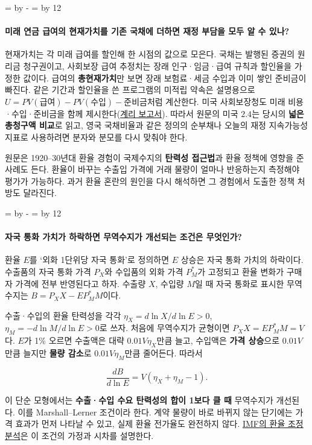 \documentclass[10pt,a4paper]{article}
\newcommand{\ReserveQuestionSpace}{%
  \par\begingroup
  \dimen0=\pagegoal \advance\dimen0 by -\pagetotal
  \dimen2=\baselineskip \multiply\dimen2 by 12
  \ifdim\dimen0<\dimen2 \newpage\fi
  \endgroup}
\begin{document}
\ReserveQuestionSpace
\paragraph{미래 연금 급여의 현재가치를 기존 국채에 더하면 재정 부담을 모두 알 수 있나?}
현재가치는 각 미래 급여를 할인해 한 시점의 값으로 모은다. 국채는 발행된 증권의 원리금 청구권이고, 사회보장 급여 추정치는 장래 인구·임금·급여 규칙과 할인율을 가정한 값이다. 급여의 \textbf{총현재가치}만 보면 장래 보험료·세금 수입과 이미 쌓인 준비금이 빠진다. 같은 기간과 할인율을 쓴 프로그램의 미적립 약속은 설명용으로 $U=PV(\mbox{급여})-PV(\mbox{수입})-\mbox{준비금}$처럼 계산한다. 미국 사회보장청도 미래 비용·수입·준비금을 함께 제시한다(\href{https://www.ssa.gov/oact/TR/2025/IV\_A\_SRest.html}{계리 보고서}). 따라서 원문의 미국 $2.4$는 당시의 \textbf{넓은 총청구액 비교}로 읽고, 영국 국채비율과 같은 정의의 순부채나 오늘의 재정 지속가능성 지표로 사용하려면 분자와 분모를 다시 맞춰야 한다.\par

원문은 1920–30년대 환율 경험이 국제수지의 \textbf{탄력성 접근법}과 환율 정책에 영향을 준 사례도 든다. 환율이 바꾸는 수출입 가격에 거래 물량이 얼마나 반응하는지 측정해야 평가가 가능하다. 과거 환율 혼란의 원인을 다시 해석하면 그 경험에서 도출한 정책 처방도 달라진다.\par

\ReserveQuestionSpace
\paragraph{자국 통화 가치가 하락하면 무역수지가 개선되는 조건은 무엇인가?}
환율 $E$를 ‘외화 1단위당 자국 통화’로 정의하면 $E$ 상승은 자국 통화 가치의 하락이다. 수출품의 자국 통화 가격 $P_X$와 수입품의 외화 가격 $P_M^*$가 고정되고 환율 변화가 구매자 가격에 전부 반영된다고 하자. 수출량 $X$, 수입량 $M$일 때 자국 통화로 표시한 무역수지는 $B=P_XX-EP_M^*M$이다.\par

수출·수입의 환율 탄력성을 각각 $\eta_X=d\ln X/d\ln E>0$, $\eta_M=-d\ln M/d\ln E>0$로 쓰자. 처음에 무역수지가 균형이면 $P_XX=EP_M^*M=V$다. $E$가 1\% 오르면 수출액은 대략 $0.01V\eta_X$만큼 늘고, 수입액은 \textbf{가격 상승}으로 $0.01V$만큼 늘지만 \textbf{물량 감소}로 $0.01V\eta_M$만큼 줄어든다. 따라서\par

\[
\frac{dB}{d\ln E}=V(\eta_X+\eta_M-1).
\]

이 단순 모형에서는 \textbf{수출·수입 수요 탄력성의 합이 1보다 클 때} 무역수지가 개선된다. 이를 Marshall–Lerner 조건이라 한다. 계약 물량이 바로 바뀌지 않는 단기에는 가격 효과가 먼저 나타날 수 있고, 실제 환율 전가율도 완전하지 않다. \href{https://www.elibrary.imf.org/display/book/9781589066267/ch03.xml}{IMF의 환율 조정 분석}은 이 조건의 가정과 시차를 설명한다.\par
\end{document}

